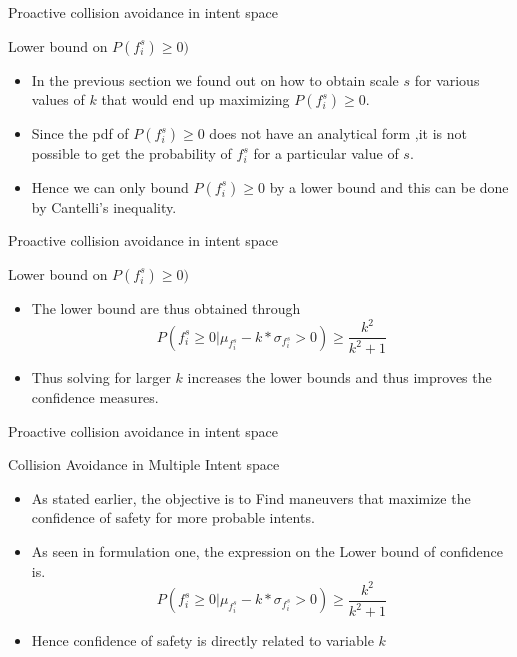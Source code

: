 \documentclass{beamer}
\begin{document}
\begin{frame}{Proactive collision avoidance in intent space}
\begin{block}{Lower bound on $P(f_i^s) \geq 0)$}

\begin{itemize}
\item{In the previous section we found out on how to obtain scale $s$ for various values of $k$ that would end up maximizing  $P(f_i^s) \geq 0$.}
\item{Since the pdf of $P(f_i^s) \geq 0$ does not have an analytical form ,it is not possible to get the probability of $f_i^s$ for a particular value of $s$.}
\item{Hence we can only bound $P(f_i^s) \geq 0$ by a lower bound and this can be done by Cantelli's inequality.}

\end{itemize}
\end{block}
\end{frame}
\begin{frame}{Proactive collision avoidance in intent space}
\begin{block}{Lower bound on $P(f_i^s) \geq 0)$}

\begin{itemize}
\item{The lower bound are thus obtained through}
$$P(f_i^s \geq 0 | \mu_{f_i^s} - k * \sigma_{f_i^s} > 0) \geq \frac{k^2}{k^2+1} $$
\item{Thus solving for larger $k$ increases the lower bounds and thus improves the confidence measures.}
\end{itemize}
\end{block}
\end{frame}
\begin{frame}{Proactive collision avoidance in intent space}
\begin{block}{Collision Avoidance in Multiple Intent space }
\begin{itemize}
\item{As stated earlier, the objective is to 
Find maneuvers that maximize the confidence of 
safety for more probable intents.}
\item{As seen in formulation one, the expression on the
Lower bound of confidence is.}
$$P(f_i^s \geq 0 | \mu_{f_i^s} - k * \sigma_{f_i^s} > 0) \geq \frac{k^2}{k^2+1} $$
\item{Hence confidence of safety is directly related to variable $k$}
\end{itemize}
\end{block}
\end{frame}
\end{document}
